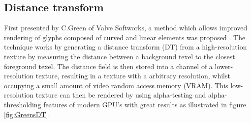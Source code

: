 \subsection{Distance transform}
First presented by C.Green of Valve Softworks, a method which allows improved rendering of glyphs composed of curved and linear elements was proposed \cite{green2007improved}. The technique works by generating a distance transform (DT) from a high-resolution texture by measuring the distance between a background texel to the closest foreground texel. The distance field is then stored into a channel of a lower-resolution texture, resulting in a texture with a arbitrary resolution, whilst occupying a small amount of video random access memory (VRAM). This low-resolution texture can then be rendered by using alpha-testing and alpha-thresholding features of modern GPU's with great results as illustrated in figure \ref{fig:GreensDT}. 

